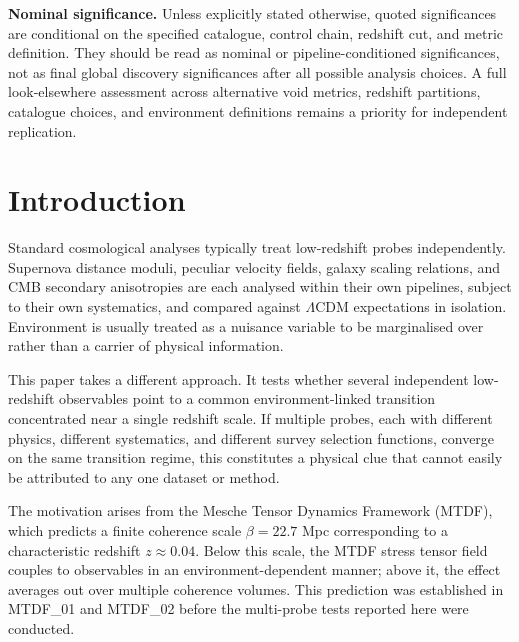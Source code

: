 \documentclass[11pt,a4paper]{article}
\begin{document}
\begin{mdframed}[linecolor=accent,linewidth=0.5pt,backgroundcolor=callout-bg,leftline=true,rightline=true,topline=true,bottomline=true,innerleftmargin=8pt,innerrightmargin=8pt,innertopmargin=6pt,innerbottommargin=6pt]
\textbf{Nominal significance.} Unless explicitly stated otherwise, quoted significances are conditional on the specified catalogue, control chain, redshift cut, and metric definition. They should be read as nominal or pipeline-conditioned significances, not as final global discovery significances after all possible analysis choices. A full look-elsewhere assessment across alternative void metrics, redshift partitions, catalogue choices, and environment definitions remains a priority for independent replication.
\end{mdframed}

\section{Introduction}
\label{sec:sec1}
Standard cosmological analyses typically treat low-redshift probes independently. Supernova distance moduli, peculiar velocity fields, galaxy scaling relations, and CMB secondary anisotropies are each analysed within their own pipelines, subject to their own systematics, and compared against \(\Lambda\)CDM expectations in isolation. Environment is usually treated as a nuisance variable to be marginalised over rather than a carrier of physical information.

This paper takes a different approach. It tests whether several independent low-redshift observables point to a common environment-linked transition concentrated near a single redshift scale. If multiple probes, each with different physics, different systematics, and different survey selection functions, converge on the same transition regime, this constitutes a physical clue that cannot easily be attributed to any one dataset or method.

The motivation arises from the Mesche Tensor Dynamics Framework (MTDF), which predicts a finite coherence scale \(\beta = 22.7\) Mpc corresponding to a characteristic redshift \(z \approx 0.04\). Below this scale, the MTDF stress tensor field couples to observables in an environment-dependent manner; above it, the effect averages out over multiple coherence volumes. This prediction was established in MTDF\_\allowbreak{}01 and MTDF\_\allowbreak{}02 before the multi-probe tests reported here were conducted.
\end{document}
